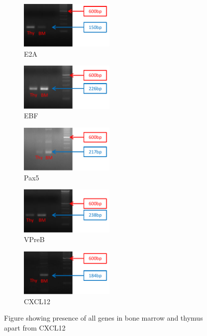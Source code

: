 \begin{figure}
	\begin{subfigure}{0.5\textwidth}
	\includegraphics[width=0.5\textwidth]{Figures/E2A.pdf}
	\caption{E2A}
	\end{subfigure}
	\begin{subfigure}{0.5\textwidth}
	\includegraphics[width=0.5\textwidth]{Figures/EBF.pdf}
	\caption{EBF}
	\end{subfigure}
	\begin{subfigure}{0.5\textwidth}
	\includegraphics[width=0.5\textwidth]{Figures/sPax5.pdf}
	\caption{Pax5}
	\end{subfigure}
	\begin{subfigure}{0.5\textwidth}
	\includegraphics[width=0.5\textwidth]{Figures/VPreB.pdf}
	\caption{VPreB}
	\end{subfigure}
	\begin{subfigure}{0.5\textwidth}
	\includegraphics[width=0.5\textwidth]{Figures/CXCL12.pdf}
	\caption{CXCL12}
	\end{subfigure}
\caption{Figure showing presence of all genes in bone marrow and thymus apart from CXCL12}
\label{fig:gels}
\end{figure}



